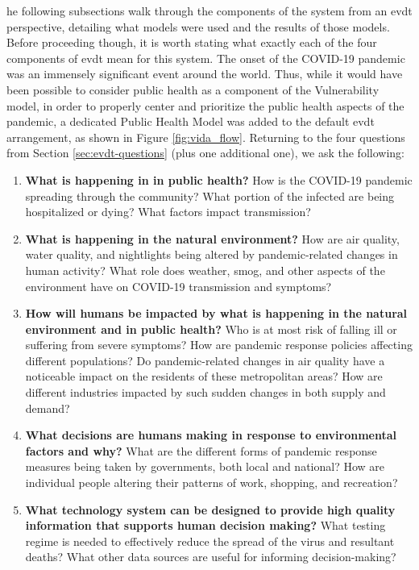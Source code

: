 he following subsections walk through the components of the system from an \acf{evdt} perspective, detailing what models were used and the results of those models. Before proceeding though, it is worth stating what exactly each of the four components of \ac{evdt} mean for this system. The onset of the COVID-19 pandemic was an immensely significant event around the world. Thus, while it would have been possible to consider public health as a component of the Vulnerability model, in order to properly center and prioritize the public health aspects of the pandemic, a dedicated Public Health Model was added to the default \ac{evdt} arrangement, as shown in Figure \ref{fig:vida_flow}. Returning to the four questions from Section \ref{sec:evdt-questions} (plus one additional one), we ask the following:

\begin{enumerate}[itemsep=0pt,parsep=0pt]
	\item \textbf{What is happening in in public health?} How is the COVID-19 pandemic spreading through the community? What portion of the infected are being hospitalized or dying? What factors impact transmission?
	\item \textbf{What is happening in the natural environment?} How are air quality, water quality, and nightlights being altered by pandemic-related changes in human activity? What role does weather, smog, and other aspects of the environment have on COVID-19 transmission and symptoms?
	\item \textbf{How will humans be impacted by what is happening in the natural environment and in public health?} Who is at most risk of falling ill or suffering from severe symptoms? How are pandemic response policies affecting different populations? Do pandemic-related changes in air quality have a noticeable impact on the residents of these metropolitan areas? How are different industries impacted by such sudden changes in both supply and demand?
	\item \textbf{What decisions are humans making in response to environmental factors and why?} What are the different forms of pandemic response measures being taken by governments, both local and national? How are individual people altering their patterns of work, shopping, and recreation?  
	\item \textbf{What technology system can be designed to provide high quality information that supports human decision making?} What testing regime is needed to effectively reduce the spread of the virus and resultant deaths? What other data sources are useful for informing decision-making?
\end{enumerate}

